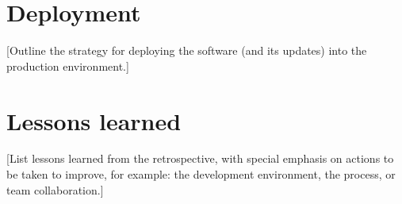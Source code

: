 \section{Deployment}
[Outline the strategy for deploying the software (and its updates) into the production environment.]
\section{Lessons learned}
[List lessons learned from the retrospective, with special emphasis on actions to be taken to improve, for example: the development environment, the process, or team collaboration.]

